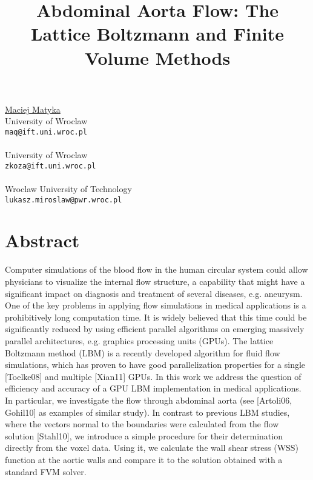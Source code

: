 \title{Abdominal Aorta Flow: The Lattice Boltzmann and Finite Volume Methods}
 \author{} \institute{}
\maketitle
\begin{center}
{\large \underline{Maciej Matyka}}\\
University of Wroclaw\\
{\tt maq@ift.uni.wroc.pl}
\\ \vspace{4mm}{\large Zbigniew Koza}\\
University of Wroclaw\\
{\tt zkoza@ift.uni.wroc.pl}
\\ \vspace{4mm}{\large Lukasz Miroslaw}\\
Wroclaw University of Technology\\
{\tt lukasz.miroslaw@pwr.wroc.pl}

\end{center}

\section*{Abstract}

Computer simulations of the blood flow in the human circular system could allow physicians to visualize the internal flow structure, a capability that might have a significant impact on diagnosis and treatment of several diseases, e.g. aneurysm. One of the key problems in applying flow simulations in medical applications is a prohibitively long computation time. It is widely believed that this time could be significantly reduced by using efficient parallel algorithms on emerging massively parallel architectures, e.g. graphics processing units (GPUs). The lattice Boltzmann method (LBM) is a recently developed algorithm for fluid flow simulations, which has proven to have good parallelization properties for a single [Toelke08] and multiple [Xian11] GPUs. In this work we address the question of efficiency and accuracy of a GPU LBM implementation in medical applications. In particular, we investigate the flow through abdominal aorta (see [Artoli06, Gohil10] as examples of similar study). In contrast to previous LBM studies, where the vectors normal to the boundaries were calculated from the flow solution [Stahl10], we introduce a simple procedure for their determination directly from the voxel data. Using it, we calculate the wall shear stress (WSS) function at the aortic walls and compare it to the solution obtained with a standard FVM solver.

